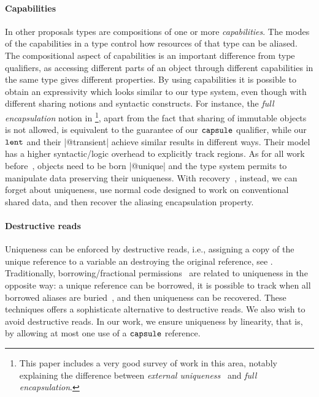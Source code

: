 \paragraph{Capabilities}
 {In other proposals \cite{HallerOdersky10,CastegrenWrigstad16} types are compositions of one or more \emph{capabilities}. The modes of the capabilities in a type control how resources of that
type can be aliased. The compositional aspect of capabilities is an important difference
from type qualifiers, as accessing different parts of an object through different capabilities in the same type gives different properties. 
By using capabilities it is possible to obtain an expressivity which looks similar to our type system, even though with different sharing notions and syntactic constructs. For instance, the \emph{full encapsulation} notion in \cite{HallerOdersky10}\footnote{{This paper includes a very good survey of work in this area, notably explaining the difference between \emph{external uniqueness}~\cite{ClarkeWrigstad03} and \emph{full encapsulation}.}}, apart from the fact that sharing of immutable objects is not allowed, is equivalent to the guarantee of our $\texttt{capsule}$ qualifier, while
our $\texttt{lent}$ and their \Q|@transient| achieve similar results in different ways.}
Their model has a higher syntactic/logic overhead to explicitly  track regions.
As for all work before~\cite{GordonEtAl12}, objects need to be born \Q|@unique| and the type system 
permits to manipulate data preserving their uniqueness. With recovery~\cite{GordonEtAl12},
instead, we can forget about uniqueness, use normal code designed to work on conventional shared data, and then
recover the aliasing encapsulation property.

\paragraph{Destructive reads} Uniqueness can be enforced by destructive reads, i.e., assigning a copy of 
the unique reference to a variable an destroying the original reference, see
\cite{GordonEtAl12,Boyland10}. Traditionally, borrowing/fractional permissions~\cite{NadenEtAl12} are related to uniqueness  in the opposite way: a unique reference can be borrowed,
it is possible to track when all borrowed aliases are buried~\cite{Boyland01}, and then uniqueness can be recovered.
These techniques offers a sophisticate alternative to destructive reads. 
We also wish to avoid destructive reads. In our work, we ensure uniqueness by linearity, that is, by allowing at most
one use of a $\texttt{capsule}$ reference.

